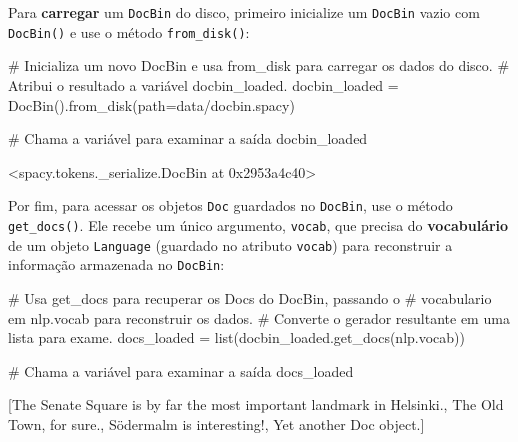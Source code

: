 \documentclass[
  brazilian,
  11pt,
]{article}
\newenvironment{Shaded}{\begin{snugshade}}{\end{snugshade}}
\newcommand{\BuiltInTok}[1]{\textcolor[rgb]{0.50,0.55,0.55}{#1}}
\newcommand{\CommentTok}[1]{\textcolor[rgb]{0.48,0.49,0.49}{#1}}
\newcommand{\NormalTok}[1]{\textcolor[rgb]{0.81,0.81,0.76}{#1}}
\newcommand{\OperatorTok}[1]{\textcolor[rgb]{0.81,0.81,0.76}{#1}}
\newcommand{\StringTok}[1]{\textcolor[rgb]{0.96,0.31,0.31}{#1}}
\let\oldtexttt\texttt
\renewcommand{\texttt}[1]{{\color{inlink}\oldtexttt{#1}}}
\begin{document}
Para \textbf{carregar} um \texttt{DocBin} do disco, primeiro inicialize
um \texttt{DocBin} vazio com \texttt{DocBin()} e use o método
\texttt{from\_disk()}:

\begin{Shaded}
\begin{Highlighting}[]
\CommentTok{\# Inicializa um novo DocBin e usa \textquotesingle{}from\_disk\textquotesingle{} para carregar os dados do disco.}
\CommentTok{\# Atribui o resultado a variável \textquotesingle{}docbin\_loaded\textquotesingle{}.}
\NormalTok{docbin\_loaded }\OperatorTok{=}\NormalTok{ DocBin().from\_disk(path}\OperatorTok{=}\StringTok{\textquotesingle{}data/docbin.spacy\textquotesingle{}}\NormalTok{)}

\CommentTok{\# Chama a variável para examinar a saída}
\NormalTok{docbin\_loaded}
\end{Highlighting}
\end{Shaded}

\begin{Shaded}
\begin{Highlighting}[]
\NormalTok{\textless{}spacy.tokens.\_serialize.DocBin at 0x2953a4c40\textgreater{}}
\end{Highlighting}
\end{Shaded}

Por fim, para acessar os objetos \texttt{Doc} guardados no
\texttt{DocBin}, use o método \texttt{get\_docs()}. Ele recebe um único
argumento, \texttt{vocab}, que precisa do \textbf{vocabulário} de um
objeto \texttt{Language} (guardado no atributo \texttt{vocab}) para
reconstruir a informação armazenada no \texttt{DocBin}:

\begin{Shaded}
\begin{Highlighting}[]
\CommentTok{\# Usa \textquotesingle{}get\_docs\textquotesingle{} para recuperar os Docs do DocBin, passando o}
\CommentTok{\# vocabulario em \textquotesingle{}nlp.vocab\textquotesingle{} para reconstruir os dados.}
\CommentTok{\# Converte o gerador resultante em uma lista para exame.}
\NormalTok{docs\_loaded }\OperatorTok{=} \BuiltInTok{list}\NormalTok{(docbin\_loaded.get\_docs(nlp.vocab))}

\CommentTok{\# Chama a variável para examinar a saída}
\NormalTok{docs\_loaded}
\end{Highlighting}
\end{Shaded}

\begin{Shaded}
\begin{Highlighting}[]
\NormalTok{[The Senate Square is by far the most important landmark in Helsinki.,}
\NormalTok{ The Old Town, for sure.,}
\NormalTok{ Södermalm is interesting!,}
\NormalTok{ Yet another Doc object.]}
\end{Highlighting}
\end{Shaded}
\end{document}
